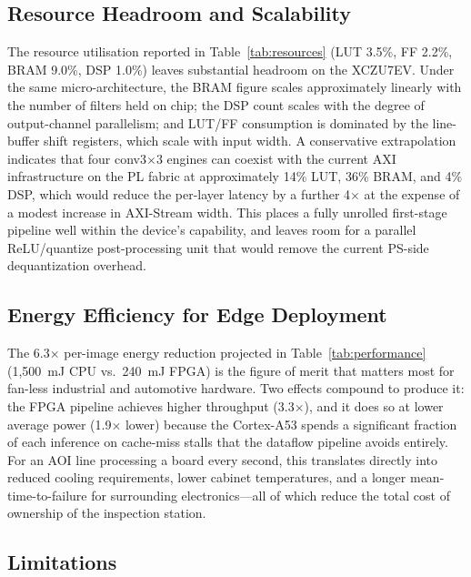 \documentclass[conference]{IEEEtran}
\begin{document}
\subsection{Resource Headroom and Scalability}

The resource utilisation reported in Table~\ref{tab:resources} (LUT 3.5\%, FF 2.2\%, BRAM 9.0\%, DSP 1.0\%) leaves substantial headroom on the XCZU7EV. Under the same micro-architecture, the BRAM figure scales approximately linearly with the number of filters held on chip; the DSP count scales with the degree of output-channel parallelism; and LUT/FF consumption is dominated by the line-buffer shift registers, which scale with input width. A conservative extrapolation indicates that four conv3$\times$3 engines can coexist with the current AXI infrastructure on the PL fabric at approximately 14\% LUT, 36\% BRAM, and 4\% DSP, which would reduce the per-layer latency by a further 4$\times$ at the expense of a modest increase in AXI-Stream width. This places a fully unrolled first-stage pipeline well within the device's capability, and leaves room for a parallel ReLU/quantize post-processing unit that would remove the current PS-side dequantization overhead.

\subsection{Energy Efficiency for Edge Deployment}

The 6.3$\times$ per-image energy reduction projected in Table~\ref{tab:performance} (1{,}500~mJ CPU vs.\ 240~mJ FPGA) is the figure of merit that matters most for fan-less industrial and automotive hardware. Two effects compound to produce it: the FPGA pipeline achieves higher throughput (3.3$\times$), and it does so at lower average power (1.9$\times$ lower) because the Cortex-A53 spends a significant fraction of each inference on cache-miss stalls that the dataflow pipeline avoids entirely. For an AOI line processing a board every second, this translates directly into reduced cooling requirements, lower cabinet temperatures, and a longer mean-time-to-failure for surrounding electronics---all of which reduce the total cost of ownership of the inspection station.

\subsection{Limitations}
\end{document}

